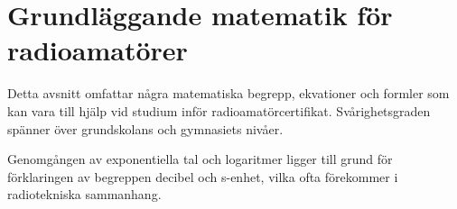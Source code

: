 \chapter{Grundläggande matematik för radioamatörer}

Detta avsnitt omfattar några matematiska begrepp, ekvationer och formler som kan
vara till hjälp vid studium inför radioamatörcertifikat. Svårighetsgraden
spänner över grundskolans och gymnasiets nivåer.

Genomgången av exponentiella tal och logaritmer ligger till grund för
förklaringen av begreppen decibel och s-enhet, vilka ofta förekommer i
radiotekniska sammanhang.


